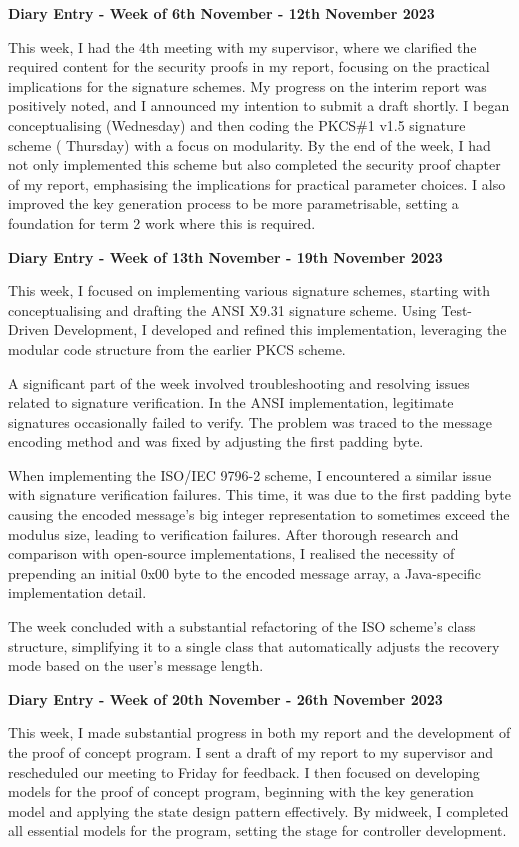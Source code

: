 \documentclass[]{final_report}
\theoremstyle{definition}
\begin{document}
\textbf{Diary Entry - Week of 6th November - 12th November 2023}

This week, I had the 4th meeting with my supervisor, where we clarified the required content for the
security proofs in my report, focusing on the practical implications for the signature schemes. My
progress on the interim report was positively noted, and I announced my intention to submit a draft
shortly. I began conceptualising (Wednesday) and then coding the PKCS\#1 v1.5 signature scheme (
Thursday) with a focus on modularity. By the end of the week, I had not only implemented this scheme
but also completed the security proof chapter of my report, emphasising the implications for
practical parameter choices. I also improved the key generation process to be more parametrisable,
setting a foundation for term 2 work where this is required.

\textbf{Diary Entry - Week of 13th November - 19th November 2023}

This week, I focused on implementing various signature schemes, starting with conceptualising and
drafting the ANSI X9.31 signature scheme. Using Test-Driven Development, I developed and refined
this implementation, leveraging the modular code structure from the earlier PKCS scheme.

A significant part of the week involved troubleshooting and resolving issues related to signature
verification. In the ANSI implementation, legitimate signatures occasionally failed to verify. The
problem was traced to the message encoding method and was fixed by adjusting the first padding byte.

When implementing the ISO/IEC 9796-2 scheme, I encountered a similar issue with signature
verification failures. This time, it was due to the first padding byte causing the encoded message's
big integer representation to sometimes exceed the modulus size, leading to verification failures.
After thorough research and comparison with open-source implementations, I realised the necessity of
prepending an initial 0x00 byte to the encoded message array, a Java-specific implementation detail.

The week concluded with a substantial refactoring of the ISO scheme's class structure, simplifying
it to a single class that automatically adjusts the recovery mode based on the user's message
length.

\textbf{Diary Entry - Week of 20th November - 26th November 2023}

This week, I made substantial progress in both my report and the development of the proof of concept
program. I sent a draft of my report to my supervisor and rescheduled our meeting to Friday for
feedback. I then focused on developing models for the proof of concept program, beginning with the
key generation model and applying the state design pattern effectively. By midweek, I completed all
essential models for the program, setting the stage for controller development.
\end{document}
